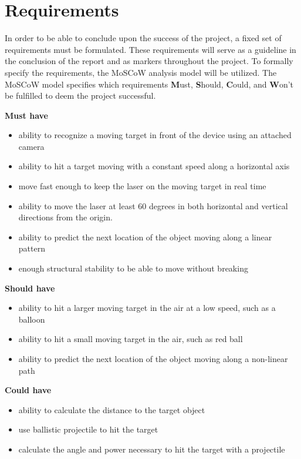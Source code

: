 \section{Requirements}
In order to be able to conclude upon the success of the project, a fixed set of requirements must be formulated.
These requirements will serve as a guideline in the conclusion of the report and as markers throughout the project. 
To formally specify the requirements, the MoSCoW analysis model will be utilized. 
The MoSCoW model specifies which requirements \textbf{M}ust, \textbf{S}hould, \textbf{C}ould, and \textbf{W}on't be fulfilled to deem the project successful.

\textbf{Must have}
\begin{itemize}
\item ability to recognize a moving target in front of the device using an attached camera
\item ability to hit a target moving with a constant speed along a horizontal axis
\item move fast enough to keep the laser on the moving target in real time
\item ability to move the laser at least 60 degrees in both horizontal and vertical directions from the origin.
\item ability to predict the next location of the object moving along a linear pattern
\item enough structural stability to be able to move without breaking
\end{itemize}

\textbf{Should have}
\begin{itemize}
\item ability to hit a larger moving target in the air at a low speed, such as a balloon \item ability to hit a small moving target in the air, such as red ball
\item ability to predict the next location of the object moving along a non-linear path
\end{itemize}

\textbf{Could have}
\begin{itemize}
\item ability to calculate the distance to the target object
\item use ballistic projectile to hit the target
\item calculate the angle and power necessary to hit the target with a projectile
\end{itemize}

